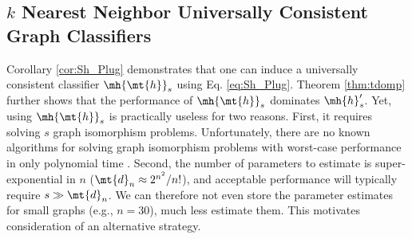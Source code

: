 \documentclass[10pt,journal,cspaper,compsoc]{IEEEtran}
\begin{document}

\subsection{$k$ Nearest Neighbor Universally Consistent Graph Classifiers} %
\label{sec:a_practical_approach_to_unlabeled_graph_classification}


Corollary \ref{cor:Sh_Plug} demonstrates that one can induce a universally consistent classifier $\mh{\mt{h}}_s$  using Eq. \eqref{eq:Sh_Plug}. Theorem \ref{thm:tdomp} further shows that the performance of $\mh{\mt{h}}_s$ dominates $\mh{h}_s'$.  Yet, using $\mh{\mt{h}}_s$ is practically useless for two reasons.  First, it requires solving $s$ graph isomorphism problems. Unfortunately, there are no known algorithms for solving graph isomorphism problems with worst-case performance in only polynomial time \cite{Fortin1996}. Second, the number of parameters to estimate is super-exponential in $n$ ($\mt{d}_n \approx 2^{n^2}/n!$), and acceptable performance will typically require $s \gg \mt{d}_n$.  We can therefore not even store the parameter estimates for small graphs (e.g., $n=30$), much less estimate them.  
This motivates consideration of an alternative strategy.
\end{document}
